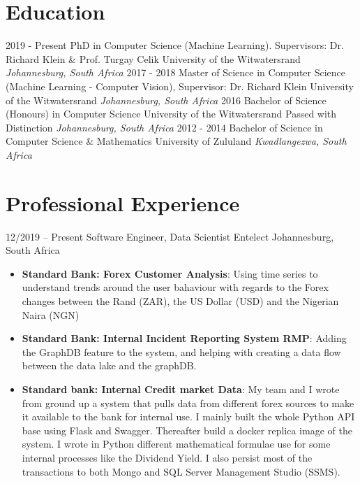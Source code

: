 \documentclass[letterpaper]{moderncv}        %
\begin{document}
\makecvtitle

%

\section{Education}
\cventry
{2019 - Present}
{PhD in Computer Science (Machine Learning). Supervisors: Dr. Richard Klein \& Prof. Turgay Celik}
{University of the Witwatersrand}
{}
{\textit{Johannesburg, South Africa}}
{}
\cventry
{2017 - 2018}
{Master of Science in Computer Science (Machine Learning - Computer Vision), Supervisor: Dr. Richard Klein}
{University of the Witwatersrand}
{}
{\textit{Johannesburg, South Africa}}
{}
\cventry
{2016}
{Bachelor of Science (Honours) in Computer Science}
{University of the Witwatersrand}
{Passed with Distinction}
{\textit{Johannesburg, South Africa}}
{}
\cventry
{2012 - 2014}
{Bachelor of Science in Computer Science \& Mathematics}
{University of Zululand}
{}
{\textit{Kwadlangezwa, South Africa}}
{}
\section{Professional Experience}

\cventry
{12/2019 -- Present}
{Software Engineer, Data Scientist}
{Entelect}
{Johannesburg, South Africa}
{}
{\begin{itemize}%
		\item \textbf{Standard Bank: Forex Customer Analysis}: Using time series to understand trends around the user bahaviour with regards to the Forex changes between the Rand (ZAR), the US Dollar (USD) and the Nigerian Naira (NGN)
		\item \textbf{Standard Bank: Internal Incident Reporting System RMP}: Adding the GraphDB feature to the system, and helping with creating a data flow between the data lake and the graphDB.
		\item \textbf{Standard bank: Internal Credit market Data}: My team and I wrote from ground up a system that pulls data from different forex sources to make it available to the bank for internal use. I mainly built the whole Python API base using Flask and Swagger. Thereafter build a docker replica image of the system. I wrote in Python different mathematical formulae use for some internal processes like the Dividend Yield. I also persist most of the transactions to both Mongo and SQL Server Management Studio (SSMS).
\end{itemize}}
\end{document}
